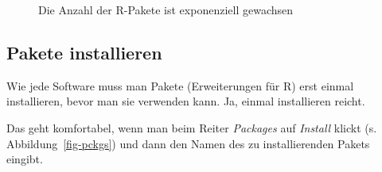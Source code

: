 \documentclass[
  a4paper,
]{scrbook}
\theoremstyle{definition}
\theoremstyle{definition}
\theoremstyle{definition}
\theoremstyle{remark}
\begin{document}
\begin{figure}


\caption{\label{fig-cran}Die Anzahl der R-Pakete ist exponenziell
gewachsen}

\end{figure}%

\subsection{Pakete installieren}\label{sec-install-r-pckgs}

Wie jede Software muss man Pakete (Erweiterungen für R) erst einmal
installieren, bevor man sie verwenden kann. Ja, einmal installieren
reicht.

Das geht komfortabel, wenn man beim Reiter \emph{Packages} auf
\emph{Install} klickt (s. Abbildung~\ref{fig-pckgs}) und dann den Namen
des zu installierenden Pakets eingibt.
\end{document}
